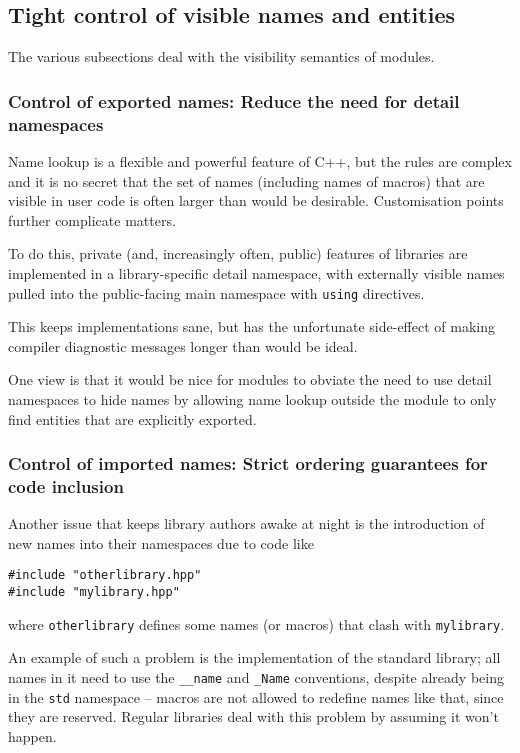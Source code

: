 \documentclass[reqno]{article}
\begin{document}
\subsection{Tight control of visible names and entities}

The various subsections deal with the visibility semantics of modules. 

\subsubsection{Control of exported names: Reduce the need for detail namespaces}

Name lookup is a flexible and powerful feature of C++, but the rules are
complex and it is no secret that the set of names (including names of macros)
that are visible in user code is often larger than would be desirable.
Customisation points further complicate matters.

To do this, private (and, increasingly often, public) features of libraries are
implemented in a library-specific detail namespace, with externally visible
names pulled into the public-facing main namespace with \texttt{using}
directives.

This keeps implementations sane, but has the unfortunate side-effect of making
compiler diagnostic messages longer than would be ideal.

One view is that it would be nice for modules to obviate the need to use detail
namespaces to hide names by allowing name lookup outside the module to only
find entities that are explicitly exported.


\subsubsection{Control of imported names: Strict ordering guarantees for code
inclusion}

Another issue that keeps library authors awake at night is the introduction of
new names into their namespaces due to code like

\begin{verbatim}
#include "otherlibrary.hpp"
#include "mylibrary.hpp"
\end{verbatim}

where \texttt{otherlibrary} defines some names (or macros) that clash with
\texttt{mylibrary}.

An example of such a problem is the implementation of the standard library; all
names in it need to use the \texttt{\_\_name} and \texttt{\_Name} conventions,
despite already being in the \texttt{std} namespace -- macros are not allowed
to redefine names like that, since they are reserved. Regular libraries deal
with this problem by assuming it won't happen.
\end{document}
